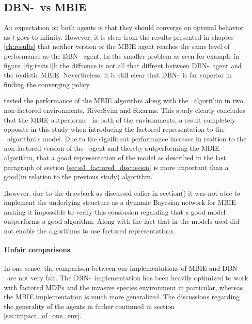 \subsection{DBN-\etre\ vs MBIE }
\label{sec:dbn_vs_mbie}
An expectation on both agents is that they should converge on optimal behavior
as $t$ goes to infinity. However, it is clear from the results presented in
chapter \ref{ch:results} that neither version of the MBIE agent reaches the
same level of performance as the DBN-\etre\ agent. In the smaller problem as
seen for example in figure~\ref{fig:tests1}b the diffrence is not all that
diffrent between DBN-\etre\ agent and the realistic MBIE. Nevertheless, it is still clear that DBN-\etre\ is far superior in finding the converging policy.

\textcite{strehl2004empirical} tested the performance of the MBIE algorithm along with the \etre\ algorithm in two non-factored environments, RiverSvim and Sixarms. This study clearly concludes that the MBIE outperforms \etre\ in both of the environments, a result completely opposite in this study when introducing the factored representation to the \etre\ algorithm's model. Due to the significant performance increase in realtion to the non-factored version of the \etre\ agent and thereby outperforming the MBIE algorithm, that a good representation of the model as described in the last paragraph of section \ref{sec:e3_factored_discussion} is more important than a good(in relation to the previous study) algorithm.  

However, due to the drawback as discussed ealier in section() it was not able to implement the underlying structure as a dynamic Bayesian network for MBIE making it impossible to verify this conslusion regarding that a good model outperforms a good algorithm. Along with the fact that in \textcite{strehl2004empirical} the models used did not enable the algorithms to use factored representations.


\paragraph{Unfair comparisons}
In one sense, the comparison between our implementations of MBIE and DBN-\etre\
are not very fair. The DBN-\etre\ implementation has been heavily optimized to
work with factored MDPs and the invasive species environment in particular,
whereas the MBIE implementation is much more generalized. The discussions
regarding the generality of the agents in furher continued in section
\ref{sec:impact_of_one_env}. 

